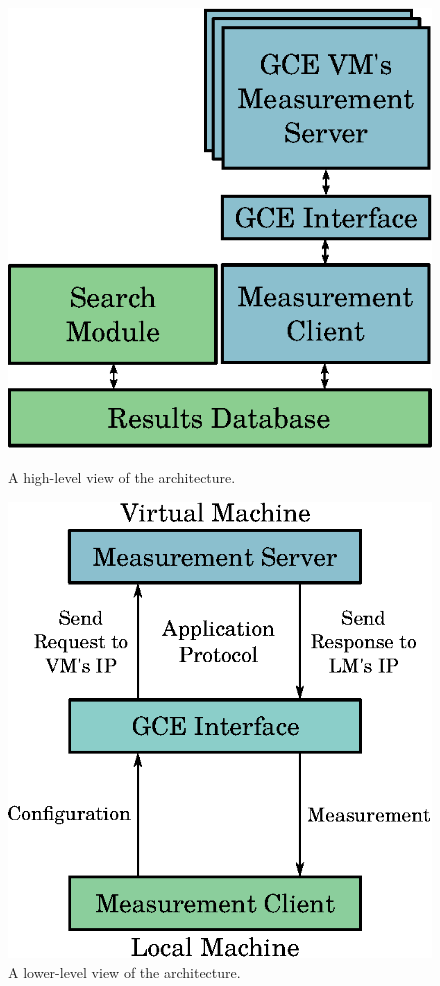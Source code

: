 \documentclass[12pt]{article}
\begin{document}
\begin{figure}[htpb]
    \centering
    \begin{minipage}{.45\textwidth}
        \centering
        \includegraphics[scale=.64]{high-level-implementation}
        \caption{A high-level view of the architecture.}
        \label{fig:high-level}
    \end{minipage}%
    \hfill
    \begin{minipage}{.45\textwidth}
        \centering
        \includegraphics[scale=.64]{low-level-implementation}
        \caption{A lower-level view of the architecture.}
        \label{fig:low-level}
    \end{minipage}%
    \label{fig:archs}
\end{figure}
\end{document}
